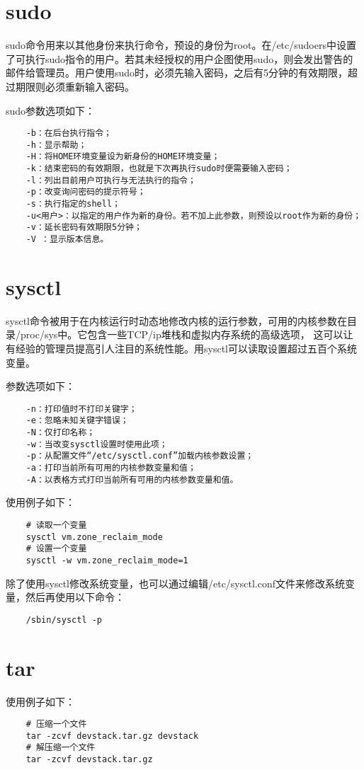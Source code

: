 \documentclass[a4paper,left=2.5cm,right=2.5cm,11pt]{article}
\begin{document}
\section{sudo}
	sudo命令用来以其他身份来执行命令，预设的身份为root。在/etc/sudoers中设置了可执行sudo指令的用户。若其未经授权的用户企图使用sudo，则会发出警告的邮件给管理员。用户使用sudo时，必须先输入密码，之后有5分钟的有效期限，超过期限则必须重新输入密码。\par

	sudo参数选项如下：
	\begin{lstlisting}
	-b：在后台执行指令； 
	-h：显示帮助； 
	-H：将HOME环境变量设为新身份的HOME环境变量； 
	-k：结束密码的有效期限，也就是下次再执行sudo时便需要输入密码；
	-l：列出目前用户可执行与无法执行的指令； 
	-p：改变询问密码的提示符号； 
	-s：执行指定的shell； 
	-u<用户>：以指定的用户作为新的身份。若不加上此参数，则预设以root作为新的身份； 
	-v：延长密码有效期限5分钟； 
	-V ：显示版本信息。
	\end{lstlisting}

\section{sysctl}
	sysctl命令被用于在内核运行时动态地修改内核的运行参数，可用的内核参数在目录/proc/sys中。它包含一些TCP/ip堆栈和虚拟内存系统的高级选项， 这可以让有经验的管理员提高引人注目的系统性能。用sysctl可以读取设置超过五百个系统变量。\par

	参数选项如下：
	\begin{lstlisting}
	-n：打印值时不打印关键字； 
	-e：忽略未知关键字错误； 
	-N：仅打印名称； 
	-w：当改变sysctl设置时使用此项； 
	-p：从配置文件“/etc/sysctl.conf”加载内核参数设置； 
	-a：打印当前所有可用的内核参数变量和值； 
	-A：以表格方式打印当前所有可用的内核参数变量和值。
	\end{lstlisting}

	使用例子如下：
	\begin{lstlisting}
	# 读取一个变量
	sysctl vm.zone_reclaim_mode
	# 设置一个变量
	sysctl -w vm.zone_reclaim_mode=1
	\end{lstlisting}

	除了使用sysctl修改系统变量，也可以通过编辑/etc/sysctl.conf文件来修改系统变量，然后再使用以下命令：
	\begin{lstlisting}
	/sbin/sysctl -p
	\end{lstlisting}

\section{tar}
	使用例子如下：
	\begin{lstlisting}
	# 压缩一个文件
	tar -zcvf devstack.tar.gz devstack
	# 解压缩一个文件
	tar -zcvf devstack.tar.gz
	\end{lstlisting}
\end{document}
